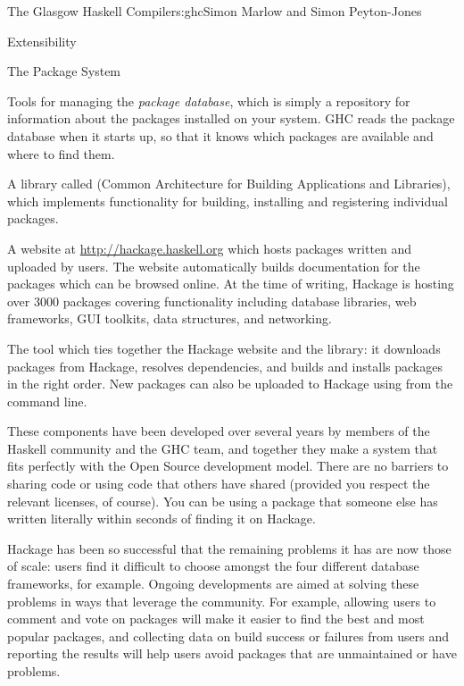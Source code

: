 \begin{aosachapter}{The Glasgow Haskell Compiler}{s:ghc}{Simon Marlow and Simon Peyton-Jones}
\begin{aosasect1}{Extensibility}
\begin{aosasect2}{The Package System}
\begin{aosaitemize}

\item Tools for managing the \emph{package database}, which is simply
  a repository for information about the packages installed on your
  system.  GHC reads the package database when it starts up, so that
  it knows which packages are available and where to find them.

\item A library called  (Common Architecture for Building
  Applications and Libraries), which implements functionality for
  building, installing and registering individual packages.

\item A website at \url{http://hackage.haskell.org} which hosts
  packages written and uploaded by users.  The website automatically
  builds documentation for the packages which can be browsed online.
  At the time of writing, Hackage is hosting over 3000 packages
  covering functionality including database libraries, web frameworks,
  GUI toolkits, data structures, and networking.

\item The  tool which ties together the Hackage website
  and the  library: it downloads packages from Hackage,
  resolves dependencies, and builds and installs packages in the right
  order.  New packages can also be uploaded to Hackage using
   from the command line.

\end{aosaitemize}

These components have been developed over several years by members of
the Haskell community and the GHC team, and together they make a
system that fits perfectly with the Open Source development model.
There are no barriers to sharing code or using code that others have
shared (provided you respect the relevant licenses, of course).  You
can be using a package that someone else has written literally within
seconds of finding it on Hackage.

Hackage has been so successful that the remaining problems it has are
now those of scale: users find it difficult to choose amongst the four
different database frameworks, for example.  Ongoing developments are
aimed at solving these problems in ways that leverage the community.
For example, allowing users to comment and vote on packages will make
it easier to find the best and most popular packages, and collecting
data on build success or failures from users and reporting the results
will help users avoid packages that are unmaintained or have problems.


\end{aosasect2}
\end{aosasect1}
\end{aosachapter}
